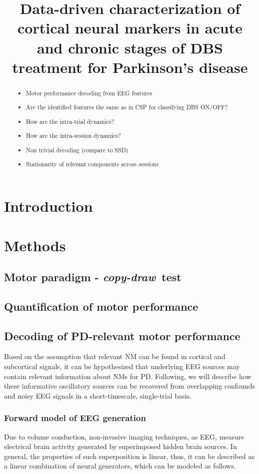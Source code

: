 \documentclass[10pt,a4paper, twocolumn]{article}
\title{Data-driven characterization of cortical neural markers in acute and chronic stages of DBS treatment for Parkinson's disease}
\newcommand{\cpdt}[0]{\textit{copy-draw}~test\xspace}
\begin{document}
\maketitle
\listoftodos

\begin{abstract}

\begin{itemize}
\item Motor performance decoding from EEG features
\item Are the identified features the same as in CSP for classifying DBS ON/OFF?
\item How are the intra-trial dynamics?
\item How are the intra-session dynamics?
\item Non trivial decoding (compare to SSD)
\item Stationarity of relevant components across sessions
\end{itemize}
\end{abstract}

\section{Introduction}

\section{Methods}
\subsection{Motor paradigm - \cpdt}
\subsection{Quantification of motor performance}
\subsection{Decoding of PD-relevant motor performance}

Based on the assumption that relevant NM can be found in cortical and subcortical signals, it can be hypothesized that underlying EEG sources may contain relevant information about NMs for PD.  Following, we will describe how these informative oscillatory sources can be recovered from overlapping confounds and noisy EEG signals in a short-timescale, single-trial basis. 

\subsubsection{Forward model of EEG generation}
\label{par:modeling}
Due to volume conduction, non-invasive imaging techniques, as EEG, measure electrical brain activity generated by superimposed hidden brain sources. In general, the properties of such superposition is linear, thus, it can be described as a linear combination of neural generators, which can be modeled as follows.
\end{document}

